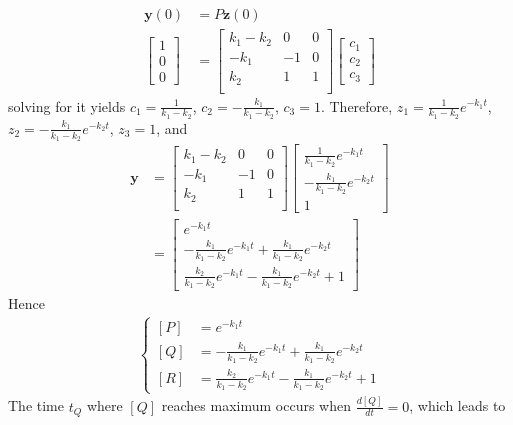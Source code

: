 \begin{solution}
\begin{align*}
\textbf{y}(0) &= P\textbf{z}(0) \\
\begin{bmatrix}
1 \\
0 \\
0
\end{bmatrix} &= 
\begin{bmatrix}
k_1-k_2 & 0 & 0\\
-k_1 & -1 & 0\\
k_2 & 1 & 1\\
\end{bmatrix}
\begin{bmatrix}
c_1 \\
c_2 \\
c_3
\end{bmatrix}
\end{align*}
solving for it yields $c_1 = \frac{1}{k_1-k_2}$, $c_2 = -\frac{k_1}{k_1-k_2}$, $c_3 = 1$. Therefore, $z_1 = \frac{1}{k_1-k_2}e^{-k_1t}$, $z_2 = -\frac{k_1}{k_1-k_2}e^{-k_2t}$, $z_3 = 1$, and
\begin{align*}
\textbf{y} &=
\begin{bmatrix}
k_1-k_2 & 0 & 0\\
-k_1 & -1 & 0\\
k_2 & 1 & 1\\
\end{bmatrix}
\begin{bmatrix}
\frac{1}{k_1-k_2}e^{-k_1t} \\
-\frac{k_1}{k_1-k_2}e^{-k_2t} \\
1
\end{bmatrix} \\
&=
\begin{bmatrix}
e^{-k_1t} \\
-\frac{k_1}{k_1-k_2}e^{-k_1t} + \frac{k_1}{k_1-k_2}e^{-k_2t} \\
\frac{k_2}{k_1-k_2}e^{-k_1t} -\frac{k_1}{k_1-k_2}e^{-k_2t} + 1 
\end{bmatrix}
\end{align*}
Hence
\begin{align*}
\begin{cases}
[P] &= e^{-k_1t} \\
[Q] &= -\frac{k_1}{k_1-k_2}e^{-k_1t} + \frac{k_1}{k_1-k_2}e^{-k_2t} \\
[R] &= \frac{k_2}{k_1-k_2}e^{-k_1t} - \frac{k_1}{k_1-k_2}e^{-k_2t} + 1   
\end{cases}
\end{align*}
The time $t_Q$ where $[Q]$ reaches maximum occurs when $\frac{d[Q]}{dt} = 0$, which leads to

\end{solution}
